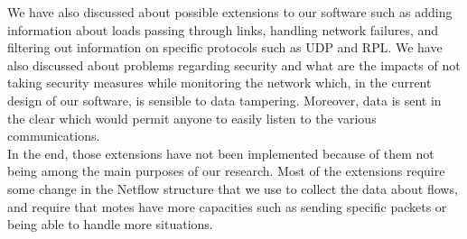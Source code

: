We have also discussed about possible extensions to our software such as adding information about loads passing through links, handling network failures, and filtering out information on specific protocols such as UDP and RPL. We have also discussed about problems regarding security and what are the impacts of not taking security measures while monitoring the network which, in the current design of our software, is sensible to data tampering. Moreover, data is sent in the clear which would permit anyone to easily listen to the various communications.\\

In the end, those extensions have not been implemented because of them not being among the main purposes of our research. Most of the extensions require some change in the Netflow structure that we use to collect the data about flows, and require that motes have more capacities such as sending specific packets or being able to handle more situations.\\
